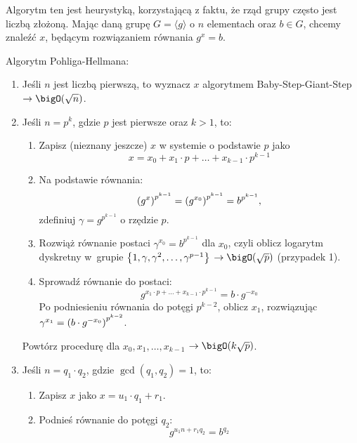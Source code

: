 Algorytm ten jest heurystyką, korzystającą z faktu, że rząd grupy często jest liczbą złożoną. Mając daną grupę \( G = \langle g \rangle \) o \( n \) elementach oraz \( b \in G \), chcemy znaleźć \( x \), będącym rozwiązaniem równania \( g^x = b \).
\begin{greyframe}
    Algorytm Pohliga-Hellmana:
    \begin{enumerate}[I]
        \item Jeśli \( n \) jest liczbą pierwszą, to wyznacz \( x \) algorytmem Baby-Step-Giant-Step \\ \( \rightarrow \bigO(\sqrt{n}) \).
        \item Jeśli \( n = p^k \), gdzie \( p \) jest pierwsze oraz \( k > 1 \), to:
            \begin{enumerate}
                \item Zapisz (nieznany jeszcze) \( x \) w systemie o podstawie \( p \) jako 
                \[
                    x = x_0 + x_1 \cdot p + \ldots + x_{k-1} \cdot p^{k-1}
                \]
                \item Na podstawie równania:
                \[
                    \left(g^x\right)^{p^{k-1}} = \left(g^{x_0}\right)^{p^{k-1}} = b^{p^{k-1}},
                \]
                zdefiniuj \( \gamma = g^{p^{k-1}} \) o rzędzie \( p \).
                \item Rozwiąż równanie postaci \( \gamma^{x_0} = b^{p^{k-1}} \) dla \( x_0 \), czyli oblicz logarytm dyskretny w~grupie \( \set{1, \gamma, \gamma^2, \ldots, \gamma^{p-1}} \) \( \rightarrow \bigO(\sqrt{p}) \) (przypadek 1).
                \item Sprowadź równanie do postaci: 
                \[
                    g^{x_1 \cdot p + \ldots + x_{k-1} \cdot p^{k-1}} = b \cdot g^{-x_0}
                \]
                Po podniesieniu równania do potęgi \( p^{k-2} \), oblicz \( x_1 \), rozwiązując \( \gamma^{x_1} = \left(b \cdot g^{-x_0}\right)^{p^{k-2}} \).
            \end{enumerate}
            Powtórz procedurę dla \( x_0, x_1, \ldots, x_{k-1} \) \( \rightarrow \bigO(k \sqrt{p}) \).
        \item Jeśli \( n  = q_1 \cdot q_2 \), gdzie \( \gcd(q_1, q_2) = 1 \), to:
        \begin{enumerate}
            \item Zapisz \( x \) jako \( x = u_1 \cdot q_1 + r_1 \).
            \item Podnieś równanie do potęgi \( q_2\):
            \[
                g^{u_1n + r_1q_2} = b^{q_2}
\]
\end{enumerate}
\end{enumerate}
\end{greyframe}

